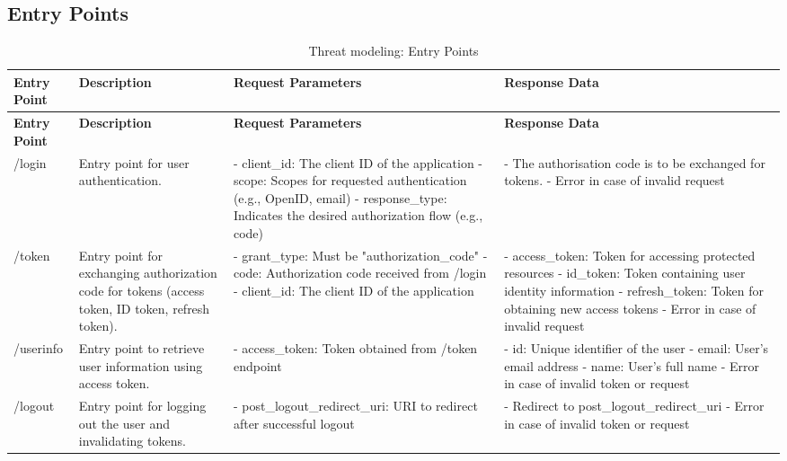\subsection{Entry Points}
\begin{longtable}{|p{3cm}|p{4cm}|p{4cm}|p{4cm}|}
\caption{Threat modeling: Entry Points}
\label{table:threat_model_entry_points}
\hline
\rowcolor{grey!15}
\textbf{Entry Point} & \textbf{Description} & \textbf{Request Parameters} & \textbf{Response Data} \\
\hline
\endfirsthead
\hline
\rowcolor{grey!15}
\textbf{Entry Point} & \textbf{Description} & \textbf{Request Parameters} & \textbf{Response Data} \\
\hline
\endhead
\endfoot
\hline
\endlastfoot

/login & Entry point for user authentication.  & 
- client\_id: The client ID of the application \newline 
- scope: Scopes for requested authentication (e.g., OpenID, email) \newline 
- response\_type: Indicates the desired authorization flow (e.g., code) & 
- The authorisation code is to be exchanged for tokens. \newline 
- Error in case of invalid request \\
\hline

/token & Entry point for exchanging authorization code for tokens (access token, ID token, refresh token). & 
- grant\_type: Must be "authorization\_code" \newline 
- code: Authorization code received from /login \newline
- client\_id: The client ID of the application & 
- access\_token: Token for accessing protected resources \newline 
- id\_token: Token containing user identity information \newline 
- refresh\_token: Token for obtaining new access tokens \newline 
- Error in case of invalid request \\
\hline

/userinfo & Entry point to retrieve user information using access token. & 
- access\_token: Token obtained from /token endpoint & 
- id: Unique identifier of the user \newline 
- email: User's email address \newline 
- name: User's full name \newline 
- Error in case of invalid token or request \\
\hline

/logout & Entry point for logging out the user and invalidating tokens. & 
- post\_logout\_redirect\_uri: URI to redirect after successful logout & 
- Redirect to post\_logout\_redirect\_uri \newline 
- Error in case of invalid token or request \\
\hline

\end{longtable}
